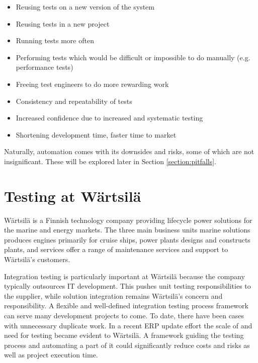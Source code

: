 \documentclass[12pt,a4paper,oneside,pdftex]{report}
\begin{document}
\begin{itemize}
\item Reusing tests on a new version of the system
\item Reusing tests in a new project
\item Running tests more often
\item Performing tests which would be difficult or impossible to do manually (e.g. performance tests)
\item Freeing test engineers to do more rewarding work
\item Consistency and repeatability of tests
\item Increased confidence due to increased and systematic testing
\item Shortening development time, faster time to market
\end{itemize}

Naturally, automation comes with its downsides and risks, some of which are not insignificant. These will be explored later in Section \ref{section:pitfalls}.

\section{Testing at Wärtsilä}

Wärtsilä is a Finnish technology company providing lifecycle power solutions for the marine and energy markets. The three main business units marine solutions produces engines primarily for cruise ships, power plants designs and constructs plants, and services offer a range of maintenance services and support to Wärtsilä's customers. \citep{wartsila2013web}


Integration testing is particularly important at Wärtsilä because the company typically outsources IT development. This pushes unit testing responsibilities to the supplier, while solution integration remains Wärtsilä's concern and responsibility. A flexible and well-defined integration testing process framework can serve many development projects to come. To date, there have been cases with unnecessary duplicate work. In a recent ERP update effort the scale of and need for testing became evident to Wärtsilä. A framework guiding the testing process and automating a part of it could significantly reduce costs and risks as well as project execution time.
\end{document}
